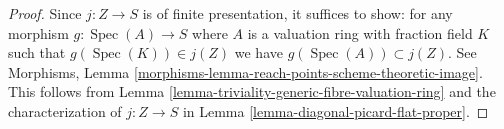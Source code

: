 \documentclass[10pt,a4paper]{amsart}
\theoremstyle{plain}
\theoremstyle{definition}
\theoremstyle{remark}
\numberwithin{equation}{subsection}
\def\Spec{\mathop{\mathrm{Spec}}}
\begin{document}
\begin{proof}
Since $j : Z \to S$ is of finite presentation, it suffices
to show: for any morphism $g : \Spec(A) \to S$ where $A$ is a
valuation ring with fraction field $K$ such that $g(\Spec(K)) \in j(Z)$
we have $g(\Spec(A)) \subset j(Z)$. See
Morphisms, Lemma \ref{morphisms-lemma-reach-points-scheme-theoretic-image}.
This follows from Lemma \ref{lemma-triviality-generic-fibre-valuation-ring}
and the characterization of $j : Z \to S$ in
Lemma \ref{lemma-diagonal-picard-flat-proper}.
\end{proof}
\end{document}
